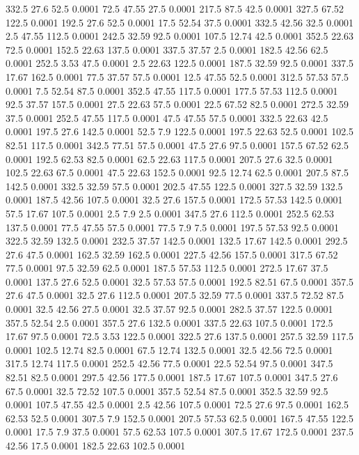 332.5	27.6	52.5	0.0001
72.5	47.55	27.5	0.0001
217.5	87.5	42.5	0.0001
327.5	67.52	122.5	0.0001
192.5	27.6	52.5	0.0001
17.5	52.54	37.5	0.0001
332.5	42.56	32.5	0.0001
2.5	47.55	112.5	0.0001
242.5	32.59	92.5	0.0001
107.5	12.74	42.5	0.0001
352.5	22.63	72.5	0.0001
152.5	22.63	137.5	0.0001
337.5	37.57	2.5	0.0001
182.5	42.56	62.5	0.0001
252.5	3.53	47.5	0.0001
2.5	22.63	122.5	0.0001
187.5	32.59	92.5	0.0001
337.5	17.67	162.5	0.0001
77.5	37.57	57.5	0.0001
12.5	47.55	52.5	0.0001
312.5	57.53	57.5	0.0001
7.5	52.54	87.5	0.0001
352.5	47.55	117.5	0.0001
177.5	57.53	112.5	0.0001
92.5	37.57	157.5	0.0001
27.5	22.63	57.5	0.0001
22.5	67.52	82.5	0.0001
272.5	32.59	37.5	0.0001
252.5	47.55	117.5	0.0001
47.5	47.55	57.5	0.0001
332.5	22.63	42.5	0.0001
197.5	27.6	142.5	0.0001
52.5	7.9	122.5	0.0001
197.5	22.63	52.5	0.0001
102.5	82.51	117.5	0.0001
342.5	77.51	57.5	0.0001
47.5	27.6	97.5	0.0001
157.5	67.52	62.5	0.0001
192.5	62.53	82.5	0.0001
62.5	22.63	117.5	0.0001
207.5	27.6	32.5	0.0001
102.5	22.63	67.5	0.0001
47.5	22.63	152.5	0.0001
92.5	12.74	62.5	0.0001
207.5	87.5	142.5	0.0001
332.5	32.59	57.5	0.0001
202.5	47.55	122.5	0.0001
327.5	32.59	132.5	0.0001
187.5	42.56	107.5	0.0001
32.5	27.6	157.5	0.0001
172.5	57.53	142.5	0.0001
57.5	17.67	107.5	0.0001
2.5	7.9	2.5	0.0001
347.5	27.6	112.5	0.0001
252.5	62.53	137.5	0.0001
77.5	47.55	57.5	0.0001
77.5	7.9	7.5	0.0001
197.5	57.53	92.5	0.0001
322.5	32.59	132.5	0.0001
232.5	37.57	142.5	0.0001
132.5	17.67	142.5	0.0001
292.5	27.6	47.5	0.0001
162.5	32.59	162.5	0.0001
227.5	42.56	157.5	0.0001
317.5	67.52	77.5	0.0001
97.5	32.59	62.5	0.0001
187.5	57.53	112.5	0.0001
272.5	17.67	37.5	0.0001
137.5	27.6	52.5	0.0001
32.5	57.53	57.5	0.0001
192.5	82.51	67.5	0.0001
357.5	27.6	47.5	0.0001
32.5	27.6	112.5	0.0001
207.5	32.59	77.5	0.0001
337.5	72.52	87.5	0.0001
32.5	42.56	27.5	0.0001
32.5	37.57	92.5	0.0001
282.5	37.57	122.5	0.0001
357.5	52.54	2.5	0.0001
357.5	27.6	132.5	0.0001
337.5	22.63	107.5	0.0001
172.5	17.67	97.5	0.0001
72.5	3.53	122.5	0.0001
322.5	27.6	137.5	0.0001
257.5	32.59	117.5	0.0001
102.5	12.74	82.5	0.0001
67.5	12.74	132.5	0.0001
32.5	42.56	72.5	0.0001
317.5	12.74	117.5	0.0001
252.5	42.56	77.5	0.0001
22.5	52.54	97.5	0.0001
347.5	82.51	82.5	0.0001
297.5	42.56	177.5	0.0001
187.5	17.67	107.5	0.0001
347.5	27.6	67.5	0.0001
32.5	72.52	107.5	0.0001
357.5	52.54	87.5	0.0001
352.5	32.59	92.5	0.0001
107.5	47.55	42.5	0.0001
2.5	42.56	107.5	0.0001
72.5	27.6	97.5	0.0001
162.5	62.53	52.5	0.0001
307.5	7.9	152.5	0.0001
207.5	57.53	62.5	0.0001
167.5	47.55	122.5	0.0001
17.5	7.9	37.5	0.0001
57.5	62.53	107.5	0.0001
307.5	17.67	172.5	0.0001
237.5	42.56	17.5	0.0001
182.5	22.63	102.5	0.0001

